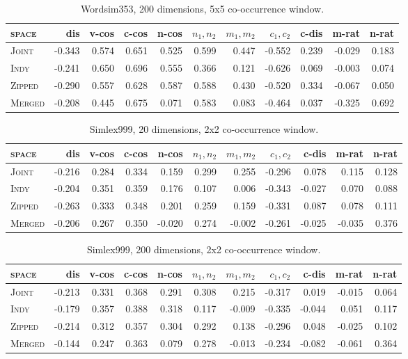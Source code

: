 \begin{table}
\begin{tabular}{lrrrrrrrrrr}
\hline
\textsc{space} & dis & v-cos & c-cos & n-cos & $n_1,n_2$ & $m_1,m_2$ & $c_1,c_2$ & c-dis & m-rat & n-rat \\
\hline
\textsc{Joint} & -0.343 & 0.574 & 0.651 & 0.525 & 0.599 & 0.447 & -0.552 & 0.239 & -0.029 & 0.183 \\
\textsc{Indy} & -0.241 & 0.650 & 0.696 & 0.555 & 0.366 & 0.121 & -0.626 & 0.069 & -0.003 & 0.074 \\
\textsc{Zipped} & -0.290 & 0.557 & 0.628 & 0.587 & 0.588 & 0.430 & -0.520 & 0.334 & -0.067 & 0.050 \\
\textsc{Merged} &-0.208 & 0.445 & 0.675 & 0.071 & 0.583 & 0.083 & -0.464 & 0.037 & -0.325 & 0.692 \\
\hline
\end{tabular}
\caption{Wordsim353, 200 dimensions, 5x5 co-occurrence window.}
\end{table}

\begin{table}
\begin{tabular}{lrrrrrrrrrr}
\hline
\textsc{space} & dis & v-cos & c-cos & n-cos & $n_1,n_2$ & $m_1,m_2$ & $c_1,c_2$ & c-dis & m-rat & n-rat \\
\hline
\textsc{Joint} & -0.216 & 0.284 & 0.334 & 0.159 & 0.299 & 0.255 & -0.296 & 0.078 & 0.115 & 0.128 \\
\textsc{Indy} & -0.204 & 0.351 & 0.359 & 0.176 & 0.107 & 0.006 & -0.343 & -0.027 & 0.070 & 0.088 \\
\textsc{Zipped} & -0.263 & 0.333 & 0.348 & 0.201 & 0.259 & 0.159 & -0.331 & 0.087 & 0.078 & 0.111 \\
\textsc{Merged} & -0.206 & 0.267 & 0.350 & -0.020 & 0.274 & -0.002 & -0.261 & -0.025 & -0.035 & 0.376 \\
\hline
\end{tabular}
\caption{Simlex999, 20 dimensions, 2x2 co-occurrence window.}
\end{table}

\begin{table}
\begin{tabular}{lrrrrrrrrrr}
\hline
\textsc{space} & dis & v-cos & c-cos & n-cos & $n_1,n_2$ & $m_1,m_2$ & $c_1,c_2$ & c-dis & m-rat & n-rat \\
\hline
\textsc{Joint} & -0.213 & 0.331 & 0.368 & 0.291 & 0.308 & 0.215 & -0.317 & 0.019 & -0.015 & 0.064 \\
\textsc{Indy} & -0.179 & 0.357 & 0.388 & 0.318 & 0.117 & -0.009 & -0.335 & -0.044 & 0.051 & 0.117 \\
\textsc{Zipped} & -0.214 & 0.312 & 0.357 & 0.304 & 0.292 & 0.138 & -0.296 & 0.048 & -0.025 & 0.102 \\
\textsc{Merged} & -0.144 & 0.247 & 0.363 & 0.079 & 0.278 & -0.013 & -0.234 & -0.082 & -0.061 & 0.364 \\
\hline
\end{tabular}
\caption{Simlex999, 200 dimensions, 2x2 co-occurrence window.}
\end{table}

